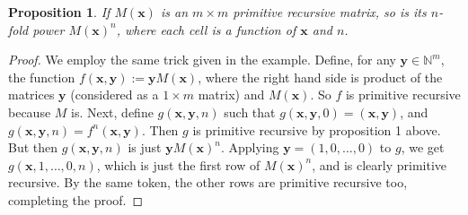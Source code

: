 \documentclass[12pt]{article}
\newtheorem{prop}{Proposition}
\begin{document}
\begin{prop} If $M(\boldsymbol{x})$ is an $m\times m$ primitive recursive matrix, so is its $n$-fold power $M(\boldsymbol{x})^n$, where each cell is a function of $\boldsymbol{x}$ and $n$. \end{prop}
\begin{proof}  We employ the same trick given in the example.  Define, for any $\boldsymbol{y}\in \mathbb{N}^m$, the function $f(\boldsymbol{x},\boldsymbol{y}) := \boldsymbol{y}M(\boldsymbol{x})$, where the right hand side is product of the matrices $\boldsymbol{y}$ (considered as a $1\times m$ matrix) and $M(\boldsymbol{x})$.  So $f$ is primitive recursive because $M$ is.  Next, define $g(\boldsymbol{x},\boldsymbol{y},n)$ such that $g(\boldsymbol{x},\boldsymbol{y},0)=(\boldsymbol{x},\boldsymbol{y})$, and $g(\boldsymbol{x},\boldsymbol{y},n)=f^n(\boldsymbol{x},\boldsymbol{y})$.  Then $g$ is primitive recursive by proposition 1 above.  But then $g(\boldsymbol{x},\boldsymbol{y},n)$ is just $\boldsymbol{y}M(\boldsymbol{x})^n$.  Applying $\boldsymbol{y}=(1,0,\ldots,0)$ to $g$, we get $g(\boldsymbol{x},1,\ldots,0,n)$, which is just the first row of $M(\boldsymbol{x})^n$, and is clearly primitive recursive.  By the same token, the other rows are primitive recursive too, completing the proof.
\end{proof}
\end{document}
